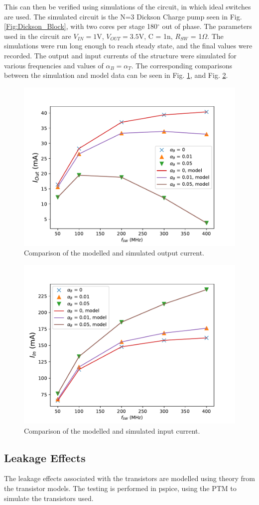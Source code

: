\documentclass[conference]{IEEEtran}
\begin{document}
	This can then be verified using simulations of the circuit, in which ideal switches are used. The simulated circuit is the N=3 Dickson Charge pump seen in Fig. \ref{Fig:Dickson_Block}, with two cores per stage 180$^\circ$ out of phase. The parameters used in the circuit are $V_{IN} = 1$V, $V_{OUT} = 3.5$V, C = 1n, $R_{SW}$ = 1$\Omega$. The simulations were run long enough to reach steady state, and the final values were recorded. The output and input currents of the structure were simulated for various frequencies and values of $\alpha_B = \alpha_T$. The corresponding comparisons between the simulation and model data can be seen in Fig. \ref{Fig:Iout_f},  and Fig. \ref{Fig:iin_f}.
	
	\begin{figure}
		\centering
		\includegraphics[width=0.9\linewidth]{Figures/Iout_f.pdf}
		\caption{Comparison of the modelled and simulated output current.}
		\label{Fig:Iout_f}
	\end{figure}

	\begin{figure}
		\centering
		\includegraphics[width=0.9\linewidth]{Figures/Iin_f.pdf}
		\caption{Comparison of the modelled and simulated input current.}
		\label{Fig:iin_f}
	\end{figure}
	
	\subsection{Leakage Effects}
	The leakage effects associated with the transistors are modelled using theory from the \cite{} transistor models. The testing is performed in pspice, using the PTM to simulate the transistors used. 
	
	
		
	
	
	
\end{document}
